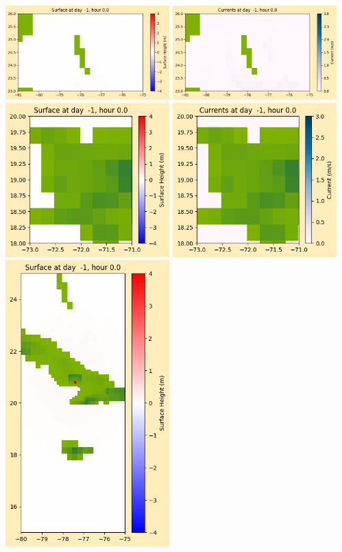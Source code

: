 \documentclass[11pt]{article}
\begin{document}
\vskip 10pt 
\includegraphics[width=0.475\textwidth]{frame0008fig1003.png}
\includegraphics[width=0.475\textwidth]{frame0008fig1004.png}
\vskip 10pt 
\includegraphics[width=0.475\textwidth]{frame0008fig1005.png}
\includegraphics[width=0.475\textwidth]{frame0008fig1006.png}
\vskip 10pt 
\includegraphics[width=0.475\textwidth]{frame0008fig1007.png}
\end{document}
